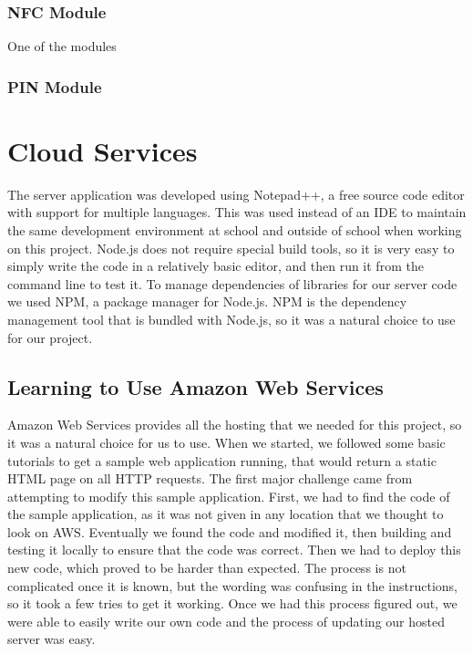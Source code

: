 \documentclass[12pt]{report}
\let\Oldsection\section
\renewcommand{\section}{\FloatBarrier\Oldsection}
\let\Oldsubsection\subsection
\renewcommand{\subsection}{\FloatBarrier\Oldsubsection}
\let\Oldsubsubsection\subsubsection
\renewcommand{\subsubsection}{\FloatBarrier\Oldsubsubsection}
\begin{document}
\subsubsection{NFC Module} \label{nfc-modules}

One of the modules 

\subsubsection{PIN Module} \label{pin-modules}




\section{Cloud Services} \label{cloud-services}


The server application was developed using Notepad++, a free source code editor with support
for multiple languages. This was used instead of an IDE to maintain the same development
environment at school and outside of school when working on this project. Node.js does not
require special build tools, so it is very easy to simply write the code in a relatively basic
editor, and then run it from the command line to test it. To manage dependencies of libraries
for our server code we used NPM, a package manager for Node.js. NPM is the dependency management
tool that is bundled with Node.js, so it was a natural choice to use for our project.



\subsection{Learning to Use Amazon Web Services} \label{learning-to-use-amazon-web-services}


Amazon Web Services provides all the hosting that we needed for this project, so it was a
natural choice for us to use. When we started, we followed some basic tutorials to get a sample
web application running, that would return a static HTML page on all HTTP requests. The first
major challenge came from attempting to modify this sample application. First, we had to find
the code of the sample application, as it was not given in any location that we thought to look on
AWS. Eventually we found the code and modified it, then building and testing it locally to
ensure that the code was correct. Then we had to deploy this new code, which proved to be
harder than expected. The process is not complicated once it is known, but the wording was
confusing in the instructions, so it took a few tries to get it working. Once we had this process
figured out, we were able to easily write our own code and the process of updating our hosted
server was easy.
\end{document}
